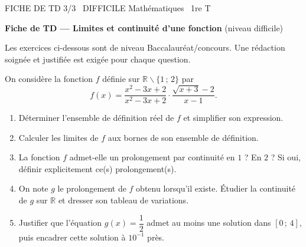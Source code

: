 \documentclass[11pt]{article}
\def\setminus{\mathbin{\backslash}}\let\smallsetminus\setminus
\begin{document}
\begin{tcolorbox}[enhanced,colback=popink,colframe=popink,arc=10pt,boxrule=0pt,left=12pt,right=12pt,top=9pt,bottom=9pt]
{\color{white}\popxbold\small FICHE DE TD 3/3 \textbullet\ DIFFICILE \hfill Mathématiques \textbullet\ 1re T\par}
\end{tcolorbox}
\vspace{4pt}
\textbf{Fiche de TD — Limites et continuité d'une fonction} (niveau difficile)

Les exercices ci-dessous sont de niveau Baccalauréat/concours. Une rédaction soignée et justifiée est exigée pour chaque question.

\begin{exercice}
On considère la fonction $f$ définie sur $\mathbb{R}\setminus\{1\,;\,2\}$ par
\[ f(x)=\dfrac{x^2-3x+2}{x^2-3x+2}\cdot\dfrac{\sqrt{x+3}-2}{x-1}. \]
\begin{enumerate}
\item Déterminer l'ensemble de définition réel de $f$ et simplifier son expression.
\item Calculer les limites de $f$ aux bornes de son ensemble de définition.
\item La fonction $f$ admet-elle un prolongement par continuité en $1$ ? En $2$ ? Si oui, définir explicitement ce(s) prolongement(s).
\item On note $g$ le prolongement de $f$ obtenu lorsqu'il existe. Étudier la continuité de $g$ sur $\mathbb{R}$ et dresser son tableau de variations.
\item Justifier que l'équation $g(x)=\dfrac{1}{2}$ admet au moins une solution dans $[0\,;\,4]$, puis encadrer cette solution à $10^{-1}$ près.
\end{enumerate}
\end{exercice}
\end{document}
